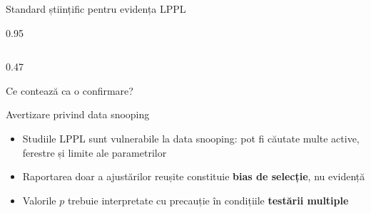\documentclass[9pt, aspectratio=169, t]{beamer}
\begin{document}
\begin{frame}{Standard științific pentru evidența LPPL}
\begin{cminipage}{0.95\textwidth}
{\begin{columns}[T]
\begin{column}{0.47\textwidth}
\begin{block}{Ce contează ca o confirmare?}
\begin{itemize}
                \end{itemize}
            \end{block}
            \vspace{-2mm}
            \begin{alertblock}{Avertizare privind data snooping}
                \begin{itemize}\setlength{\itemsep}{0pt}
                    \item Studiile LPPL sunt vulnerabile la data snooping: pot fi căutate multe active, ferestre și limite ale parametrilor
                    \item Raportarea doar a ajustărilor reușite constituie \textbf{bias de selecție}, nu evidență
                    \item Valorile $p$ trebuie interpretate cu precauție în condițiile \textbf{testării multiple}
                \end{itemize}
            \end{alertblock}
        \end{column}
    \end{columns}
    }
    \end{cminipage}
\end{frame}
\end{document}
